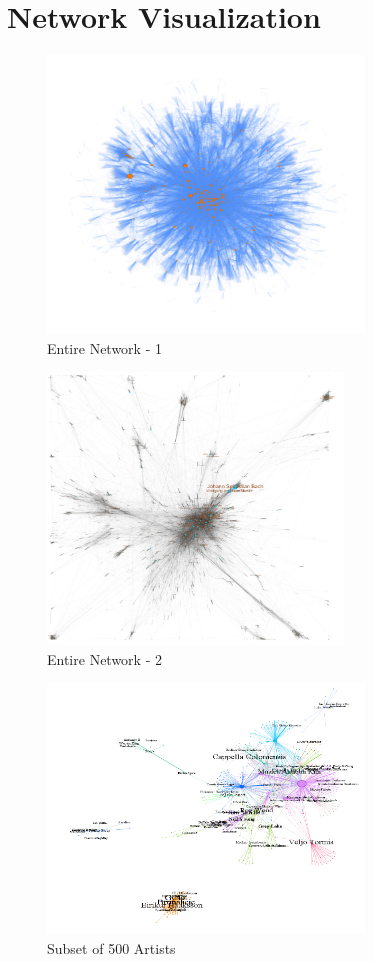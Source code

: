 \documentclass[12pt,a4paper]{article}
\begin{document}
\section{Network Visualization}
\begin{figure}[H]
  \centering
  \includegraphics[width=0.75\textwidth]{entire2}
  \caption{Entire Network - 1}
\end{figure}

\begin{figure}[H]
  \centering
  \includegraphics[width=0.7\textwidth]{entire1}
  \caption{Entire Network - 2}
\end{figure}

\begin{figure}[H]
  \centering
  \includegraphics[width=0.75\textwidth]{english}
  \caption{Subset of 500 Artists}
\end{figure}
\end{document}
